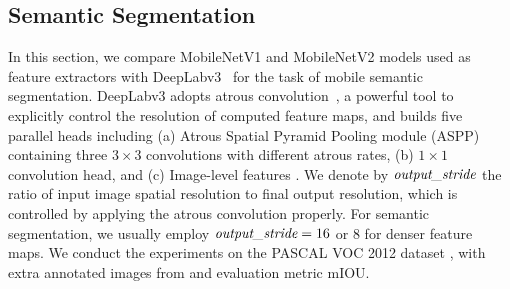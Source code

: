 \documentclass[10pt,twocolumn,letterpaper]{article}
\begin{document}
\begin{table}[!t]
  \centering
  \caption{
      Performance comparison of \mbox{MobileNetV2} + SSDLite and other realtime detectors on the COCO dataset object detection task.
      \mbox{MobileNetV2} + SSDLite achieves competitive accuracy with significantly fewer parameters and smaller computational complexity.
      All models are trained on \mbox{\tt trainval35k} and evaluated on \mbox{\tt test-dev}.
      \mbox{SSD/YOLOv2} numbers are from \cite{redmon2016yolo9000}.
      The running time is reported for the large core of the Google \mbox{Pixel 1} phone, using an internal version of the \mbox{TF-Lite} engine.
  }
  \label{tab:mobilenet_ssd}
\end{table}

\subsection{Semantic Segmentation}
In this section, we compare \mbox{MobileNetV1} and \mbox{MobileNetV2} models used as feature extractors with \mbox{DeepLabv3}~\cite{DeepLabV3} for the task of mobile semantic segmentation.
\mbox{DeepLabv3} adopts atrous convolution~\cite{Holschneider1989real, Sermanet2013Overfeat, Papandreou2014untangling}, a powerful tool to explicitly control the resolution of computed feature maps, and builds five parallel heads including (a) Atrous Spatial Pyramid Pooling module (ASPP) \cite{DeepLabV2} containing three $3\times 3$ convolutions with different atrous rates, (b) $1\times 1$ convolution head, and (c) Image-level features \cite{ParseNet}.
We denote by $\emph{output\_stride}$ the ratio of input image spatial resolution to final output resolution, which is controlled by applying the atrous convolution properly.
For semantic segmentation, we usually employ $\emph{output\_stride}=16$ or $8$ for denser feature maps.
We conduct the experiments on the \mbox{PASCAL} VOC 2012 dataset \cite{PASCAL}, with extra annotated images from \cite{Hariharan2011semantic} and evaluation metric mIOU.
\end{document}
